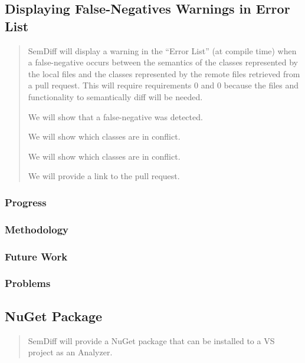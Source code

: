 \documentclass[draftclsnofoot,onecolumn]{IEEEtran}
\begin{document}
\subsection{Displaying False-Negatives Warnings in Error List}

\begin{quote}

SemDiff will display a warning in the “Error List” (at compile time) when a false-negative occurs between the semantics of the classes represented by the local files and the classes represented by the remote files retrieved from a pull request. This will require requirements 0 and 0 because the files and functionality to semantically diff will be needed.

We will show that a false-negative was detected.

We will show which classes are in conflict.

We will show which classes are in conflict.

We will provide a link to the pull request.

\end{quote}

\subsubsection{Progress}

\subsubsection{Methodology}

\subsubsection{Future Work}

\subsubsection{Problems}






\subsection{NuGet Package}

\begin{quote}

SemDiff will provide a NuGet package that can be installed to a VS project as an Analyzer.

\end{quote}
\end{document}
